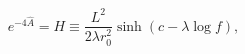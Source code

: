 \begin{equation}
e^{-4\hat A}=H\equiv\frac{L^2}{2\lambda r_0^2} \sinh(c- \lambda\log f),
\end{equation}

